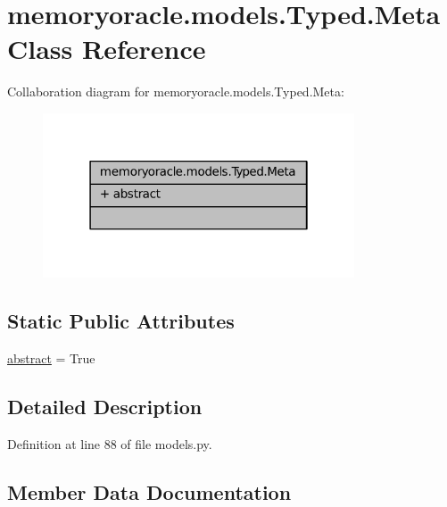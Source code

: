 \hypertarget{classmemoryoracle_1_1models_1_1Typed_1_1Meta}{}\section{memoryoracle.\+models.\+Typed.\+Meta Class Reference}
\label{classmemoryoracle_1_1models_1_1Typed_1_1Meta}


Collaboration diagram for memoryoracle.\+models.\+Typed.\+Meta\+:\nopagebreak
\begin{figure}[H]
\begin{center}
\leavevmode
\includegraphics[width=262pt]{classmemoryoracle_1_1models_1_1Typed_1_1Meta__coll__graph}
\end{center}
\end{figure}
\subsection*{Static Public Attributes}
\begin{DoxyCompactItemize}
\item 
\hyperlink{classmemoryoracle_1_1models_1_1Typed_1_1Meta_a09bfecfa2da59fa84361b0dce162696f}{abstract} = True
\end{DoxyCompactItemize}


\subsection{Detailed Description}


Definition at line 88 of file models.\+py.



\subsection{Member Data Documentation}
\hypertarget{classmemoryoracle_1_1models_1_1Typed_1_1Meta_a09bfecfa2da59fa84361b0dce162696f}{}

